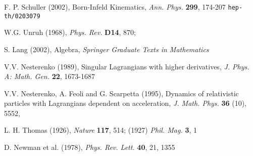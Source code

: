 \documentclass[11pt,a4paper,twoside]{article}
\begin{document}
\begin{thebibliography}{00}
 F. P. Schuller (2002), Born-Infeld Kinematics,
\textit{Ann. Phys.} \textbf{299}, 174-207 {\tt hep-th/0203079}

W.G. Unruh
(1968),
\textit{Phys. Rev.}
\textbf{D14},
870;

 S. Lang (2002), Algebra, \textit{Springer Graduate Texts in
Mathematics}

V.V. Nesterenko (1989), Singular Lagrangians with
higher derivatives, \textit{J. Phys. A: Math. Gen.} \textbf{22}, 1673-1687

 {V.V. Nesterenko}, A. Feoli and G. Scarpetta (1995),
Dynamics of relativistic particles with Lagrangians dependent
on acceleration, \textit{J. Math. Phys.} \textbf{36} (10), 5552,

 L. H. Thomas (1926), \textit{Nature} \textbf{117},
514; (1927) \textit{Phil. Mag.} \textbf{3}, 1

 D. Newman et al. (1978), \textit{Phys. Rev. Lett.}
\textbf{40}, 21, 1355
\end{thebibliography}
\end{document}
